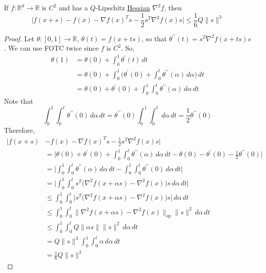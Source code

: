 	\begin{theorem}
	  \label{thm:taylors-2nd-order-bound}
		If $f: \mathbb{R}^d \to \mathbb{R}$ is $C^2$ and has a $Q$-Lipschitz \hyperref[mv-def:hessian]{Hessian} $\nabla^2 f$, then 
		\begin{equation}
			\bigg| f(x + s) - f(x) - \nabla f(x)^T s - \frac{1}{2} s^T \nabla^2 f(x) s \bigg| \leq \frac{1}{6} Q \|s\|^3
		\end{equation}
	\end{theorem}
	\begin{proof}
		Let $\theta: [0, 1] \to \mathbb{R}$, $\theta(t) = f(x + ts)$, so that $\theta^{\prime\prime}(t) = s^T \nabla^2 f(x + ts) s$. We can use FOTC twice since $f$ is $C^2$. So, 
		\begin{align}
			\theta(1) & = \theta(0) + \int_0^1 \theta^\prime (t) \,dt \\ 
								& = \theta(0) + \int_0^1 \bigg( \theta^\prime(0) + \int_0^t \theta^{\prime\prime}(\alpha) \,d\alpha \bigg) \, dt \\ 
								& = \theta(0) + \theta^\prime (0) + \int_0^1 \int_0^t \theta^{\prime\prime} (\alpha) \,d\alpha \,dt 
		\end{align}
		Note that 
		\begin{equation}
			\int_0^1 \int_0^t \theta^{\prime\prime} (0) \,d\alpha \,dt = \theta^{\prime\prime} (0) \int_0^1 \int_0^t \,d\alpha \,dt = \frac{1}{2} \theta^{\prime\prime} (0)
		\end{equation}
		Therefore, 
		\begin{align}
			\bigg| f(x + s) & - f(x) - \nabla f(x)^T s - \frac{1}{2} s^T \nabla^2 f(x) s \bigg| \\ 
											& = \bigg| \theta(0) + \theta^{\prime} (0) + \int_0^1 \int_0^t \theta^{\prime\prime}(\alpha) \,d\alpha \,dt - \theta(0) - \theta^\prime (0) - \frac{1}{2} \theta^{\prime\prime} (0) \bigg| \\ 
											& = \bigg| \int_0^1 \int_0^t \theta^{\prime\prime} (\alpha) \,d\alpha \,dt - \int_0^1 \int_0^t \theta^{\prime\prime}(0) \,d\alpha \,dt \bigg| \\ 
											& = \bigg| \int_0^1 \int_0^t s^T \big( \nabla^2 f(x + \alpha s) - \nabla^2 f(x) \big) s \,d\alpha \,dt \bigg| \\ 
											& \leq \int_0^1 \int_0^t \big| s^T \big( \nabla^2 f(x + \alpha s) - \nabla^2 f(x) \big) s \big| \,d\alpha \,dt \\
											& \leq \int_0^1 \int_0^t \big\| \nabla^2 f(x + \alpha s) - \nabla^2 f(x) \big\|_{op} \|s\|^2 \,d\alpha \,dt \\
											& \leq \int_0^1 \int_0^t Q \|\alpha s\| \|s\|^2 \,d\alpha \,dt \\
											& = Q \|s\|^3 \int_0^1 \int_0^t \alpha \,d\alpha \,dt \\
											& = \frac{1}{6} Q \|s\|^3
		\end{align}
	\end{proof}

